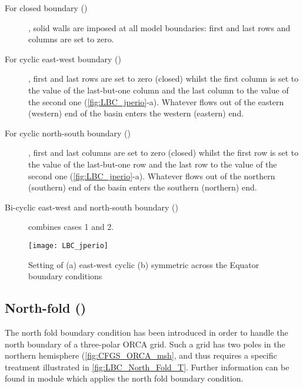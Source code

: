 \documentclass[../main/NEMO_manual]{subfiles}
\begin{document}
\begin{description}

\item [For closed boundary ()], solid walls are imposed at all model boundaries:
  first and last rows and columns are set to zero.

\item [For cyclic east-west boundary ()], first and last rows are set to zero (closed) whilst the first column is set to
  the value of the last-but-one column and the last column to the value of the second one
  (\autoref{fig:LBC_jperio}-a).
  Whatever flows out of the eastern (western) end of the basin enters the western (eastern) end.

\item [For cyclic north-south boundary ()], first and last columns are set to zero (closed) whilst the first row is set to
  the value of the last-but-one row and the last row to the value of the second one
  (\autoref{fig:LBC_jperio}-a).
  Whatever flows out of the northern (southern) end of the basin enters the southern (northern) end.

\item [Bi-cyclic east-west and north-south boundary ()] combines cases 1 and 2.

\end{description}

\begin{figure}[!t]
  \centering
  \texttt{[image: LBC\_jperio]}
  \caption[Setting of east-west cyclic and symmetric across the Equator boundary conditions]{
    Setting of (a) east-west cyclic (b) symmetric across the Equator boundary conditions}
  \label{fig:LBC_jperio}
\end{figure}

\subsection{North-fold ()}
\label{subsec:LBC_north_fold}

The north fold boundary condition has been introduced in order to handle the north boundary of
a three-polar ORCA grid.
Such a grid has two poles in the northern hemisphere (\autoref{fig:CFGS_ORCA_msh},
and thus requires a specific treatment illustrated in \autoref{fig:LBC_North_Fold_T}.
Further information can be found in  module which applies the north fold boundary condition.
\end{document}
